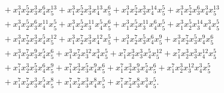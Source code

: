 \documentclass[reqno]{amsart}
\theoremstyle{plain}
\theoremstyle{definition}
\theoremstyle{plain}
\theoremstyle{definition}
\numberwithin{equation}{section}
\begin{document}
\begin{align*}
&\quad + x_1^{3}x_2^{5}x_3^{3}x_4^{6}x_5^{13} + x_1^{3}x_2^{5}x_3^{3}x_4^{13}x_5^{6} + x_1^{3}x_2^{5}x_3^{3}x_4^{14}x_5^{5} + x_1^{3}x_2^{5}x_3^{6}x_4^{3}x_5^{13}\\ 
&\quad + x_1^{3}x_2^{5}x_3^{6}x_4^{11}x_5^{5} + x_1^{3}x_2^{5}x_3^{11}x_4^{5}x_5^{6} + x_1^{3}x_2^{5}x_3^{11}x_4^{6}x_5^{5} + x_1^{3}x_2^{5}x_3^{14}x_4^{3}x_5^{5}\\ 
&\quad + x_1^{3}x_2^{7}x_3^{3}x_4^{5}x_5^{12} + x_1^{3}x_2^{7}x_3^{3}x_4^{12}x_5^{5} + x_1^{3}x_2^{7}x_3^{5}x_4^{6}x_5^{9} + x_1^{3}x_2^{7}x_3^{5}x_4^{9}x_5^{6}\\ 
&\quad + x_1^{3}x_2^{7}x_3^{9}x_4^{5}x_5^{6} + x_1^{3}x_2^{7}x_3^{12}x_4^{3}x_5^{5} + x_1^{7}x_2^{3}x_3^{3}x_4^{5}x_5^{12} + x_1^{7}x_2^{3}x_3^{3}x_4^{12}x_5^{5}\\ 
&\quad + x_1^{7}x_2^{3}x_3^{5}x_4^{6}x_5^{9} + x_1^{7}x_2^{3}x_3^{5}x_4^{9}x_5^{6} + x_1^{7}x_2^{3}x_3^{9}x_4^{5}x_5^{6} + x_1^{7}x_2^{3}x_3^{12}x_4^{3}x_5^{5}\\ 
&\quad + x_1^{7}x_2^{7}x_3^{3}x_4^{5}x_5^{8} + x_1^{7}x_2^{7}x_3^{3}x_4^{8}x_5^{5} + x_1^{7}x_2^{7}x_3^{8}x_4^{3}x_5^{5}.
\end{align*}
	
\end{document}
